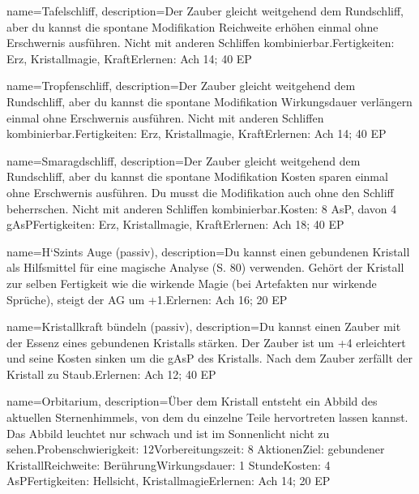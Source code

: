{
    name={Tafelschliff},
    description={Der Zauber gleicht weitgehend dem Rundschliff, aber du kannst die spontane Modifikation Reichweite erhöhen einmal ohne Erschwernis ausführen. Nicht mit anderen Schliffen kombinierbar.\newline Fertigkeiten: Erz, Kristallmagie, Kraft\newline Erlernen: Ach 14; 40 EP}
}


{
    name={Tropfenschliff},
    description={Der Zauber gleicht weitgehend dem Rundschliff, aber du kannst die spontane Modifikation Wirkungsdauer verlängern einmal ohne Erschwernis ausführen. Nicht mit anderen Schliffen kombinierbar.\newline Fertigkeiten: Erz, Kristallmagie, Kraft\newline Erlernen: Ach 14; 40 EP}
}


{
    name={Smaragdschliff},
    description={Der Zauber gleicht weitgehend dem Rundschliff, aber du kannst die spontane Modifikation Kosten sparen einmal ohne Erschwernis ausführen. Du musst die Modifikation auch ohne den Schliff beherrschen. Nicht mit anderen Schliffen kombinierbar.\newline Kosten: 8 AsP, davon 4 gAsP\newline Fertigkeiten: Erz, Kristallmagie, Kraft\newline Erlernen: Ach 18; 40 EP}
}


{
    name={H‘Szints Auge (passiv)},
    description={Du kannst einen gebundenen Kristall als Hilfsmittel für eine magische Analyse (S. 80) verwenden. Gehört der Kristall zur selben Fertigkeit wie die wirkende Magie (bei Artefakten nur wirkende Sprüche), steigt der AG um +1.\newline Erlernen: Ach 16; 20 EP}
}


{
    name={Kristallkraft bündeln (passiv)},
    description={Du kannst einen Zauber mit der Essenz eines gebundenen Kristalls stärken. Der Zauber ist um +4 erleichtert und seine Kosten sinken um die gAsP des Kristalls. Nach dem Zauber zerfällt der Kristall zu Staub.\newline Erlernen: Ach 12; 40 EP}
}


{
    name={Orbitarium},
    description={Über dem Kristall entsteht ein Abbild des aktuellen Sternenhimmels, von dem du einzelne Teile hervortreten lassen kannst. Das Abbild leuchtet nur schwach und ist im Sonnenlicht nicht zu sehen.\newline Probenschwierigkeit: 12\newline Vorbereitungszeit: 8 Aktionen\newline Ziel: gebundener Kristall\newline Reichweite: Berührung\newline Wirkungsdauer: 1 Stunde\newline Kosten: 4 AsP\newline Fertigkeiten: Hellsicht, Kristallmagie\newline Erlernen: Ach 14; 20 EP}
}


